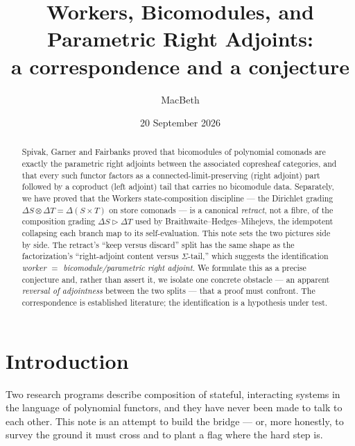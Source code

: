 \documentclass[11pt]{amsart}
\title[Workers, bicomodules, and parametric right adjoints]
{Workers, Bicomodules, and Parametric Right Adjoints:\\ a correspondence and a conjecture}
\author{MacBeth}
\date{20 September 2026}
\theoremstyle{plain}
\theoremstyle{definition}
\theoremstyle{gap}
\renewcommand{\lhd}{\vartriangleright}
\newcommand{\Store}[1]{\Delta #1}
\begin{document}
\begin{abstract}
Spivak, Garner and Fairbanks proved that bicomodules of polynomial comonads are
exactly the parametric right adjoints between the associated copresheaf categories,
and that every such functor factors as a connected-limit-preserving (right adjoint)
part followed by a coproduct (left adjoint) tail that carries no bicomodule data.
Separately, we have proved that the Workers state-composition discipline --- the
Dirichlet grading $\Store{S}\otimes\Store{T}=\Store{(S\times T)}$ on store comonads
--- is a canonical \emph{retract}, not a fibre, of the composition grading
$\Store{S}\lhd\Store{T}$ used by Braithwaite--Hedges--Mihejevs, the idempotent
collapsing each branch map to its self-evaluation. This note sets the two pictures
side by side. The retract's ``keep versus discard'' split has the same shape as the
factorization's ``right-adjoint content versus $\Sigma$-tail,'' which suggests the
identification \emph{worker $=$ bicomodule/parametric right adjoint}. We formulate
this as a precise conjecture and, rather than assert it, we isolate one concrete
obstacle --- an apparent \emph{reversal of adjointness} between the two splits ---
that a proof must confront. The correspondence is established literature; the
identification is a hypothesis under test.
\end{abstract}

\maketitle

\section{Introduction}

Two research programs describe composition of stateful, interacting systems in the
language of polynomial functors, and they have never been made to talk to each
other. This note is an attempt to build the bridge --- or, more honestly, to survey
the ground it must cross and to plant a flag where the hard step is.
\end{document}
